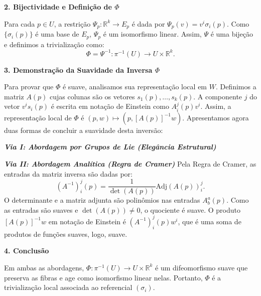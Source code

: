 {	\textbf{2. Bijectividade e Definição de $\Phi$}
	
	Para cada $p \in U$, a restrição $\Psi_p : \mathbb{R}^k \to E_p$ é dada por $\Psi_p(v) = v^i \sigma_i(p)$. Como $\{\sigma_i(p)\}$ é uma base de $E_p$, $\Psi_p$ é um isomorfismo linear. Assim, $\Psi$ é uma bijeção e definimos a trivialização como:
	\begin{equation*}
		\Phi = \Psi^{-1} : \pi^{-1}(U) \to U \times \mathbb{R}^k.
	\end{equation*}
	
	\textbf{3. Demonstração da Suavidade da Inversa $\Phi$}
	
	Para provar que $\Phi$ é suave, analisamos sua representação local em $W$. Definimos a matriz $A(p)$ cujas colunas são os vetores $s_1(p), \dots, s_k(p)$. A componente $j$ do vetor $v^i s_i(p)$ é escrita em notação de Einstein como $A^j_i(p) v^i$. Assim, a representação local de $\Phi$ é $(p, w) \mapsto (p, [A(p)]^{-1} w)$. Apresentamos agora duas formas de concluir a suavidade desta inversão:
	
	\textit{\textbf{Via I: Abordagem por Grupos de Lie (Elegância Estrutural)}}
	
	\textit{\textbf{Via II: Abordagem Analítica (Regra de Cramer)}}
	Pela Regra de Cramer, as entradas da matriz inversa são dadas por:
	\begin{equation*}
		(A^{-1})^j_i(p) = \frac{1}{\det(A(p))} \text{Adj}(A(p))^j_i.
	\end{equation*}
	O determinante e a matriz adjunta são polinômios nas entradas $A^a_b(p)$. Como as entradas são suaves e $\det(A(p)) \neq 0$, o quociente é suave. O produto $[A(p)]^{-1} w$ em notação de Einstein é $(A^{-1})^j_i(p) w^i$, que é uma soma de produtos de funções suaves, logo, suave.
	
	\textbf{4. Conclusão}
	
	Em ambas as abordagens, $\Phi: \pi^{-1}(U) \to U \times \mathbb{R}^k$ é um difeomorfismo suave que preserva as fibras e age como isomorfismo linear nelas. Portanto, $\Phi$ é a trivialização local associada ao referencial $(\sigma_i)$.
}

